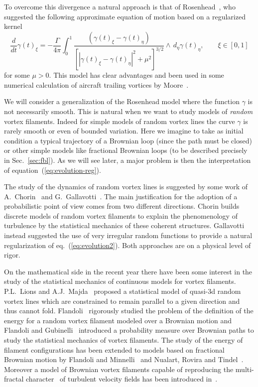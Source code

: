 \documentclass[a4paper,12pt,reqno]{amsart}
\begin{document}
To overcome this divergence a natural approach is that of
Rosenhead~\cite{Rosenhead}, who suggested the following approximate equation of
motion based on a regularized kernel
\begin{equation}
  \label{eq:evolution-reg}
 \frac{d}{dt} \gamma(t)_\xi 
= -\frac{\Gamma}{4\pi}
\int_0^1\frac{(\gamma(t)_\xi-\gamma(t)_\eta)}{[|\gamma(t)_\xi-\gamma(t)_\eta|^2
  + \mu^2]^{3/2}}\wedge \, d_\eta \gamma(t)_\eta
, \qquad \xi
 \in [0,1]  
\end{equation}
for some $\mu>0.$
This model has clear advantages and been used in some  numerical
calculation of  aircraft trailing vortices by Moore~\cite{Moore}.

We will consider a generalization of the Rosenhead model 
where the function $\gamma$ is not necessarily smooth. This
is natural when we want to study models of
\emph{random} vortex filaments. Indeed for simple models of random
vortex lines the curve $\gamma$ is rarely smooth or even of bounded
variation. Here we imagine to take as initial condition a
typical trajectory of a Brownian loop (since the path must be closed)
or other simple models like fractional Brownian loops (to be described
precisely in Sec.~\ref{sec:fbl}). 
As we will see later, a major  problem is then the interpretation of 
equation~(\ref{eq:evolution-reg}).
 


The study of the dynamics of random vortex lines is suggested by some
work of A.~Chorin~\cite{Chorin} and G.~Gallavotti~\cite{Gallavotti}.
The main justification for the adoption of a probabilistic point of
view comes from two different directions. Chorin builds discrete models of
random vortex filaments to explain the phenomenology of turbulence by
the statistical mechanics of these coherent structures. Gallavotti
instead suggested the use of very irregular random functions to
provide a natural regularization of eq.~(\ref{eq:evolution2}). Both
approaches are on a physical level of rigor. 

On the mathematical side in the recent year there have been some
interest in the study of the statistical mechanics of continuous
models for vortex filaments. 
P.L.~Lions and A.J.~Majda~\cite{LionsMajda} proposed a
statistical model of quasi-3d random vortex lines which are constrained
to remain parallel to a given direction and thus cannot fold.
Flandoli~\cite{Flandoli} rigorously studied the problem of the
definition of the energy for a random vortex filament modeled over a
Brownian motion and Flandoli and Gubinelli~\cite{FlaGub} introduced a
probability measure over Brownian paths to study the statistical
mechanics of vortex filaments. The study of the energy of filament
configurations has been extended to models based on fractional
Brownian motion by Flandoli
and Minnelli~\cite{FlaMin} and Nualart, Rovira and Tindel~\cite{NRT}.
Moreover a model of Brownian vortex
filaments capable of reproducing the multi-fractal character~\cite{Frisch} of
turbulent velocity fields has been introduced in~\cite{FlaGub2}.
\end{document}
